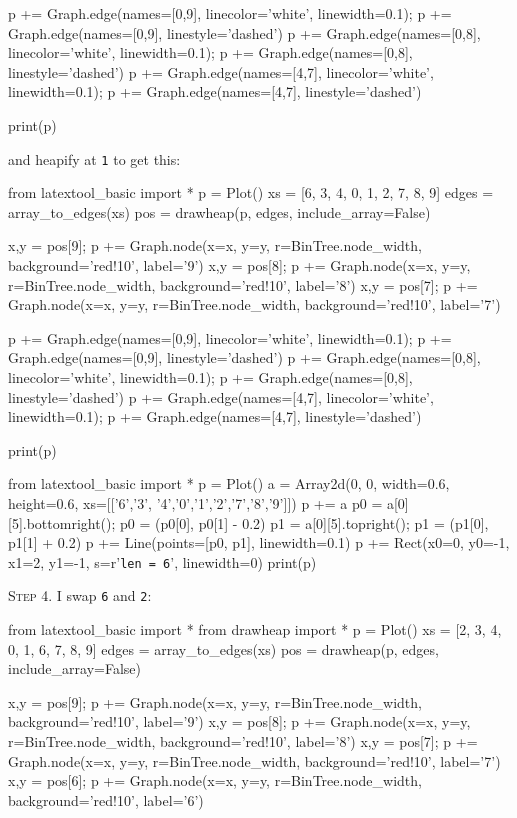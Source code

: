 p += Graph.edge(names=[0,9], linecolor='white', linewidth=0.1); p += Graph.edge(names=[0,9], linestyle='dashed')
p += Graph.edge(names=[0,8], linecolor='white', linewidth=0.1); p += Graph.edge(names=[0,8], linestyle='dashed')
p += Graph.edge(names=[4,7], linecolor='white', linewidth=0.1); p += Graph.edge(names=[4,7], linestyle='dashed')

print(p)

and heapify at \texttt{1} to get this:


from latextool_basic import *
p = Plot()
xs = [6, 3, 4, 0, 1, 2, 7, 8, 9]
edges = array_to_edges(xs)
pos = drawheap(p, edges, include_array=False)

x,y = pos[9]; p += Graph.node(x=x, y=y, r=BinTree.node_width, background='red!10', label='9')
x,y = pos[8]; p += Graph.node(x=x, y=y, r=BinTree.node_width, background='red!10', label='8')
x,y = pos[7]; p += Graph.node(x=x, y=y, r=BinTree.node_width, background='red!10', label='7')

p += Graph.edge(names=[0,9], linecolor='white', linewidth=0.1); p += Graph.edge(names=[0,9], linestyle='dashed')
p += Graph.edge(names=[0,8], linecolor='white', linewidth=0.1); p += Graph.edge(names=[0,8], linestyle='dashed')
p += Graph.edge(names=[4,7], linecolor='white', linewidth=0.1); p += Graph.edge(names=[4,7], linestyle='dashed')

print(p)

from latextool_basic import *
p = Plot()
a = Array2d(0, 0, width=0.6, height=0.6, 
             xs=[['6','3', '4','0','1','2','7','8','9']])
p += a
p0 = a[0][5].bottomright(); p0 = (p0[0], p0[1] - 0.2)
p1 = a[0][5].topright(); p1 = (p1[0], p1[1] + 0.2)
p += Line(points=[p0, p1], linewidth=0.1)
p += Rect(x0=0, y0=-1, x1=2, y1=-1, s=r'\texttt{len = 6}', linewidth=0) 
print(p)

\textsc{Step 4}.
I swap \texttt{6} and \texttt{2}:


from latextool_basic import *
from drawheap import *
p = Plot()
xs = [2, 3, 4, 0, 1, 6, 7, 8, 9]
edges = array_to_edges(xs)
pos = drawheap(p, edges, include_array=False)

x,y = pos[9]; p += Graph.node(x=x, y=y, r=BinTree.node_width, background='red!10', label='9')
x,y = pos[8]; p += Graph.node(x=x, y=y, r=BinTree.node_width, background='red!10', label='8')
x,y = pos[7]; p += Graph.node(x=x, y=y, r=BinTree.node_width, background='red!10', label='7')
x,y = pos[6]; p += Graph.node(x=x, y=y, r=BinTree.node_width, background='red!10', label='6')

